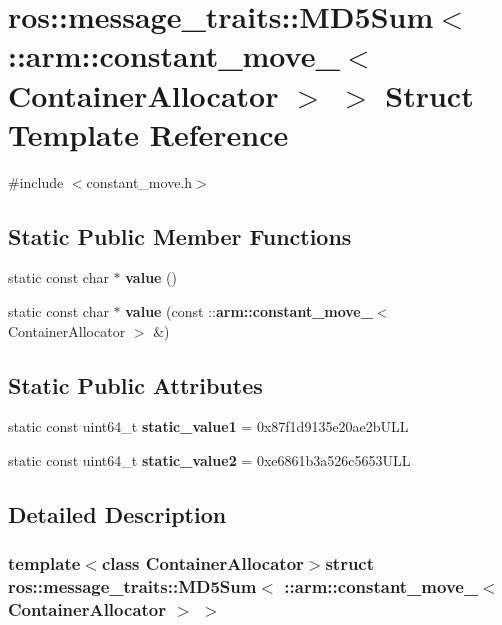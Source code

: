 \section{ros\-:\-:message\-\_\-traits\-:\-:\-M\-D5\-Sum$<$ \-:\-:arm\-:\-:constant\-\_\-move\-\_\-$<$ \-Container\-Allocator $>$ $>$ \-Struct \-Template \-Reference}
\label{structros_1_1message__traits_1_1MD5Sum_3_01_1_1arm_1_1constant__move___3_01ContainerAllocator_01_4_01_4}


{\ttfamily \#include $<$constant\-\_\-move.\-h$>$}

\subsection*{\-Static \-Public \-Member \-Functions}
\begin{DoxyCompactItemize}
\item 
static const char $\ast$ {\bf value} ()
\item 
static const char $\ast$ {\bf value} (const \-::{\bf arm\-::constant\-\_\-move\-\_\-}$<$ \-Container\-Allocator $>$ \&)
\end{DoxyCompactItemize}
\subsection*{\-Static \-Public \-Attributes}
\begin{DoxyCompactItemize}
\item 
static const uint64\-\_\-t {\bf static\-\_\-value1} = 0x87f1d9135e20ae2b\-U\-L\-L
\item 
static const uint64\-\_\-t {\bf static\-\_\-value2} = 0xe6861b3a526c5653\-U\-L\-L
\end{DoxyCompactItemize}


\subsection{\-Detailed \-Description}
\subsubsection*{template$<$class Container\-Allocator$>$struct ros\-::message\-\_\-traits\-::\-M\-D5\-Sum$<$ \-::arm\-::constant\-\_\-move\-\_\-$<$ Container\-Allocator $>$ $>$}



